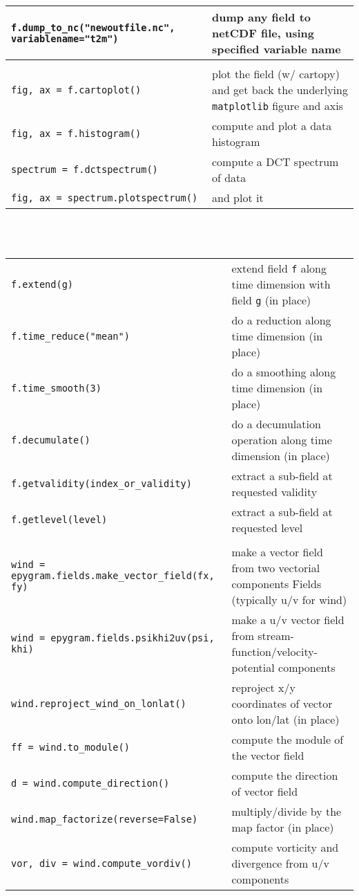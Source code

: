 \documentclass[a4paper,10pt]{article}
\begin{document}
\begin{tabular}{|p{9.5cm}|p{9.5cm}|}
\texttt{f.dump\_to\_nc("newoutfile.nc", variablename="t2m")} & dump any field to netCDF file, using specified variable name\\
\hline
\rowcolor{gray!50}
\multicolumn{2}{|c|}{\textbf{Fields data representation}}\\
\hline
\texttt{fig, ax = f.cartoplot()} & plot the field (w/ cartopy) and get back the underlying \texttt{matplotlib} figure and axis\\
\texttt{fig, ax = f.histogram()} & compute and plot a data histogram\\
\texttt{spectrum = f.dctspectrum()} & compute a DCT spectrum of data\\
\texttt{fig, ax = spectrum.plotspectrum()} & and plot it\\
\hline
\end{tabular}\\
\\

\begin{tabular}{|p{9.5cm}|p{9.5cm}|}
\hline
\rowcolor{gray!50}
\multicolumn{2}{|c|}{\textbf{n-D Fields}}\\
\hline
\texttt{f.extend(g)} & extend field \texttt{f} along time dimension with field \texttt{g} (in place)\\
\texttt{f.time\_reduce("mean")} & do a reduction along time dimension (in place)\\
\texttt{f.time\_smooth(3)} & do a smoothing along time dimension (in place)\\
\texttt{f.decumulate()} & do a decumulation operation along time dimension (in place)\\
\texttt{f.getvalidity(index\_or\_validity)} & extract a sub-field at requested validity\\
\texttt{f.getlevel(level)} & extract a sub-field at requested level\\
\hline
\rowcolor{gray!50}
\multicolumn{2}{|c|}{\textbf{Vector Fields}}\\
\hline
\texttt{wind = epygram.fields.make\_vector\_field(fx, fy)} & make a vector field from two vectorial components Fields (typically u/v for wind)\\
\texttt{wind = epygram.fields.psikhi2uv(psi, khi)} & make a u/v vector field from stream-function/velocity-potential components \footnotemark[1]\\
\texttt{wind.reproject\_wind\_on\_lonlat()} & reproject x/y coordinates of vector onto lon/lat (in place)\\
\texttt{ff = wind.to\_module()} & compute the module of the vector field\\
\texttt{d = wind.compute\_direction()} & compute the direction of vector
 field\\
\texttt{wind.map\_factorize(reverse=False)} & multiply/divide by the map factor (in place)\\
\texttt{vor, div = wind.compute\_vordiv()} & compute vorticity and divergence from u/v components \footnotemark[1]\\
\hline
\end{tabular}\\
\\
\end{document}
